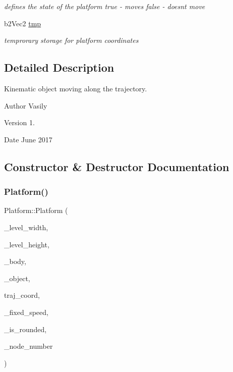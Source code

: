 \begin{DoxyCompactItemize}
\begin{DoxyCompactList}\small\item\em defines the state of the platform \textquotesingle{}true\textquotesingle{} -\/ moves \textquotesingle{}false\textquotesingle{} -\/ doesn\textquotesingle{}t move \end{DoxyCompactList}\item 
\mbox{\label{class_platform_a2f120cbb66ac4972fdd05ba816484dc0}} 
b2\+Vec2 \hyperlink{class_platform_a2f120cbb66ac4972fdd05ba816484dc0}{tmp}
\begin{DoxyCompactList}\small\item\em temprorary storage for platform coordinates \end{DoxyCompactList}\end{DoxyCompactItemize}


\subsection{Detailed Description}
Kinematic object moving along the trajectory. 

\begin{DoxyAuthor}{Author}
Vasily 
\end{DoxyAuthor}
\begin{DoxyVersion}{Version}
1. 
\end{DoxyVersion}
\begin{DoxyDate}{Date}
June 2017 
\end{DoxyDate}


\subsection{Constructor \& Destructor Documentation}
\mbox{\label{class_platform_a39509ca7de720cf50d0b0ea71e29bfaf}} 
\subsubsection{\texorpdfstring{Platform()}{Platform()}}
{\footnotesize\ttfamily Platform\+::\+Platform (\begin{DoxyParamCaption}\item[{int}]{\+\_\+level\+\_\+width,  }\item[{int}]{\+\_\+level\+\_\+height,  }\item[{b2\+Body $\ast$}]{\+\_\+body,  }\item[{\hyperlink{class_object}{Object} $\ast$}]{\+\_\+object,  }\item[{std\+::vector$<$ std\+::pair$<$ double, double $>$$>$}]{traj\+\_\+coord,  }\item[{int}]{\+\_\+fixed\+\_\+speed,  }\item[{bool}]{\+\_\+is\+\_\+rounded,  }\item[{int}]{\+\_\+node\+\_\+number }\end{DoxyParamCaption})}



